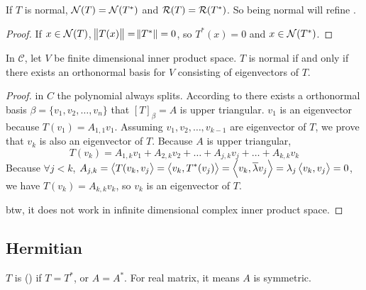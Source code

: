 \begin{theorem}
    If $T$ is normal, $\mathcal{N}(T) = \mathcal{N}(T^*)$ and $\mathcal{R}(T) = \mathcal{R}(T^*)$. So being normal will refine .
\end{theorem}
\begin{proof}
    If $x \in \mathcal{N}(T)$, $\norm{T(x)} = \norm{T^*} = 0$, so $T^*(x) = 0$ and $x \in \mathcal{N}(T^*)$.
\end{proof}



\begin{theorem}
    In $\mathcal{C}$, let $V$ be finite dimensional inner product space. $T$ is normal if and only if there exists an orthonormal basis for $V$ consisting of eigenvectors of $T$.
\end{theorem}
\begin{proof}
    in $C$ the polynomial always splits. According to  there exists a orthonormal basis $\beta = \{v_1, v_2, \dots, v_n\}$ that $[T]_\beta = A$ is upper triangular. $v_1$ is an eigenvector because $T(v_1)=A_{1,1} v_1$. Assuming $v_1, v_2, \dots, v_{k-1}$ are eigenvector of $T$, we prove that $v_k$ is also an eigenvector of $T$. Because $A$ is upper triangular, 
    \begin{equation*}
        T(v_k) = A_{1,k} v_1 + A_{2,k} v_2 + \dots + A_{j,k} v_j + \dots + A_{k,k} v_k
    \end{equation*}
    Because $\forall j < k$, $A_{j,k} = \left\langle \displaystyle T(v_k, v_j \right\rangle = \left\langle \displaystyle v_k, T^*(v_j) \right\rangle = \left\langle \displaystyle v_k, \overline{\lambda} v_j \right\rangle = \lambda_j \left\langle \displaystyle v_k, v_j \right\rangle = 0$, we have $T(v_k) = A_{k,k} v_k$, so $v_k$ is an eigenvector of $T$.
    
    btw, it does not work in infinite dimensional complex inner product space.
\end{proof}






\subsection{Hermitian}

\begin{definition}
    $T$ is  () if $T = T^*$, or $A = A^*$. For real matrix, it means $A$ is symmetric.
\end{definition}

